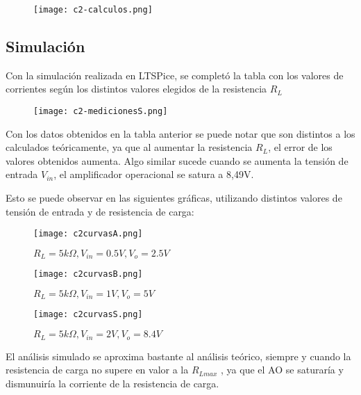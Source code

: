 \begin{figure}[h!]
     \centering
	 \texttt{[image: c2-calculos.png]}
	 \label{fig:esquematico2}
  \end{figure}

\subsection{Simulación}

Con la simulación realizada en LTSPice, se completó la tabla con los valores de corrientes según los distintos valores elegidos de la resistencia $R_L$


  \vspace{1em}

\begin{figure}[h!]
 	\centering
 	\texttt{[image: c2-medicionesS.png]}
	 \label{fig:esquematico2}
\end{figure}


Con los datos obtenidos en la tabla anterior se puede notar que son distintos a los calculados teóricamente, ya que al aumentar la resistencia $R_L$, el error de los valores obtenidos aumenta. 
Algo similar sucede cuando se aumenta la tensión de entrada $V_{in}$, el amplificador operacional se satura a 8,49V.

Esto se puede observar en las siguientes gráficas, utilizando distintos valores de tensión de entrada y de resistencia de carga:

  \begin{figure}[h!]
     \centering
	 \texttt{[image: c2curvasA.png]}
	 \caption{$R_L= 5k\Omega, V_{in}= 0.5V, V_o =2.5V $}
	 \label{fig:esquematico2}
  \end{figure}

 \vspace{1em}
 
  \begin{figure}[h!]
     \centering
	 \texttt{[image: c2curvasB.png]}
	 \caption{$R_L= 5k\Omega, V_{in}= 1V, V_o =5V $}
	 \label{fig:esquematico2}
  \end{figure}
 
  \vspace{1em}
  
 \begin{figure}[h!]
     \centering
	 \texttt{[image: c2curvasS.png]}
	 \caption{$R_L= 5k\Omega, V_{in}= 2V , V_o= 8.4V $}
	 \label{fig:esquematico2}
 \end{figure}
 
 El análisis simulado se aproxima bastante al análisis teórico, siempre y cuando la resistencia de carga no supere en valor a la $R_{Lmax}$ , ya que el AO se saturaría y dismunuiría la corriente de la resistencia de carga.

%